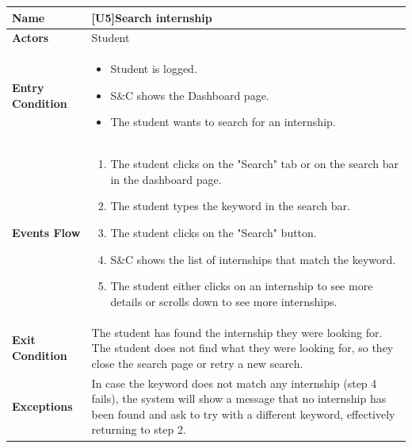 \begin{center}
    \begin{tabular}{|p{9em}|p{27em}|}
        \hline
        \rowcolor{bluepoli!40} %
        \textbf{Name} & \textbf{[U5]Search internship} \\
        \hline
        \textbf{Actors} & Student \\
        \hline
        \textbf{Entry Condition} &  
        \begin{itemize}
            \item Student is logged.
            \item S\&C shows the Dashboard page.
            \item The student wants to search for an internship.
        \end{itemize} \\
        \hline
        \textbf{Events Flow} & 
        \begin{enumerate}
            \item The student clicks on the "Search" tab or on the search bar in the dashboard page.
            \item The student types the keyword in the search bar.
            \item The student clicks on the "Search" button.
            \item S\&C shows the list of internships that match the keyword.
            \item The student either clicks on an internship to see more details or scrolls down to see more internships.
        \end{enumerate} \\
        \hline
        \textbf{Exit Condition} & The student has found the internship they were looking for. The student does not find what they were looking for,
        so they close the search page or retry a new search. \\
        \hline
        \textbf{Exceptions} & In case the keyword does not match any internship (step 4 fails), the system will show a message that no internship
        has been found and ask to try with a different keyword, effectively returning to step 2. \\
        \hline
    \end{tabular}
\end{center}

